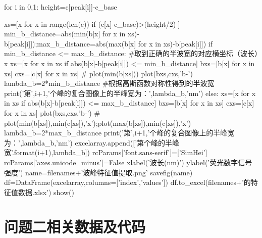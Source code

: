 \documentclass{article}
\numberwithin{equation}{subsection}
\begin{document}
\begin{python}
    for i in 0,1:  
            height=c[peak[i]]-c_base

            xs=[x for x in range(len(c)) if (c[x]-c_base)>(height/2) ]
            min_b_distance=abs(min(b[x] for x in xs)-b[peak[i]]);max_b_distance=abs(max(b[x] for x in xs)-b[peak[i]])   
            if min_b_distance <= max_b_distance:                #取到正确的半波宽的对应横坐标（波长）x
                xs=[x for x in xs if abs(b[x]-b[peak[i]]) <= min_b_distance]
                bxs=[b[x] for x in xs]
                cxs=[c[x] for x in xs]
                # plot(min(b[xs]))
                plot(bxs,cxs,'b-')
                lambda_b=2*min_b_distance          #根据高斯函数对称性得到的半波宽
                print('第',i+1,'个峰的复合图像上的半峰宽为：',lambda_b,'nm')
            else:
                xs=[x for x in xs if abs(b[x]-b[peak[i]]) <= max_b_distance]
                bxs=[b[x] for x in xs]
                cxs=[c[x] for x in xs]
                plot(bxs,cxs,'b-')
                # plot(min(b[xs]),min(c[xs]),'x');plot(max(b[xs]),min(c[xs]),'x')
                lambda_b=2*max_b_distance
                print('第',i+1,'个峰的复合图像上的半峰宽为：',lambda_b,'nm')
            excelarray.append(['第{}个峰的半峰宽'.format(i+1),lambda_b])
    rcParams['font.sans-serif']=['SimHei']
    rcParams['axes.unicode_minus']=False
    xlabel('波长(nm)')
    ylabel('荧光数字信号强度')
    name=filenames+'波峰特征值提取.png'
    savefig(name)
    df=DataFrame(excelarray,columns=['index','values'])
    df.to_excel(filenames+'的特征值数据.xlsx')
    show()
\end{python}



\section{问题二相关数据及代码}
\end{document}
